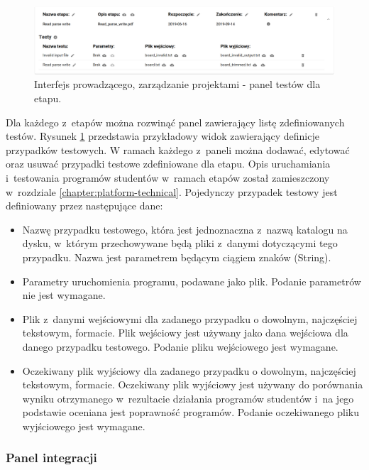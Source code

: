 \begin{figure}[h]
    \centering
    \includegraphics[width = 16cm]{chapter04/lecturer_stages_tests.png}
    \caption{Interfejs prowadzącego, zarządzanie projektami - panel testów dla etapu.}
    \label{fig:lecturer_stages_tests}
\end{figure}

Dla każdego z~etapów można rozwinąć panel zawierający listę zdefiniowanych testów.
Rysunek \ref{fig:lecturer_stages_tests} przedstawia przykładowy widok zawierający definicje przypadków testowych.
W ramach każdego z~paneli można dodawać, edytować oraz usuwać przypadki testowe zdefiniowane dla etapu.
Opis uruchamiania i~testowania programów studentów w~ramach etapów został zamieszczony w~rozdziale \ref{chapter:platform-technical}.
Pojedynczy przypadek testowy jest definiowany przez następujące dane:
\begin {itemize}
    \item Nazwę przypadku testowego, która jest jednoznaczna z~nazwą katalogu na dysku, w~którym przechowywane będą pliki z~danymi dotyczącymi tego przypadku.
    Nazwa jest parametrem będącym ciągiem znaków (String).
    \item Parametry uruchomienia programu, podawane jako plik.
    Podanie parametrów nie jest wymagane.
    \item Plik z~danymi wejściowymi dla zadanego przypadku o dowolnym, najczęściej tekstowym, formacie.
    Plik wejściowy jest używany jako dana wejściowa dla danego przypadku testowego.
    Podanie pliku wejściowego jest wymagane.
    \item Oczekiwany plik wyjściowy dla zadanego przypadku o dowolnym, najczęściej tekstowym, formacie.
    Oczekiwany plik wyjściowy jest używany do porównania wyniku otrzymanego w~rezultacie działania programów studentów i~na jego podstawie oceniana jest poprawność programów.
    Podanie oczekiwanego pliku wyjściowego jest wymagane.
\end {itemize}



\subsubsection{Panel integracji}

